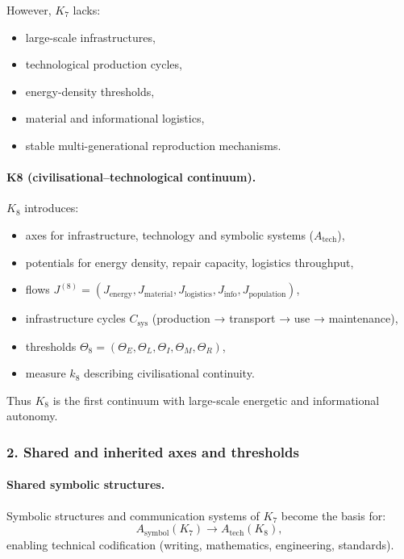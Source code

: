 However, $K_7$ lacks:
\begin{itemize}
  \item large-scale infrastructures,
  \item technological production cycles,
  \item energy-density thresholds,
  \item material and informational logistics,
  \item stable multi-generational reproduction mechanisms.
\end{itemize}

\paragraph{K8 (civilisational–technological continuum).}
$K_8$ introduces:
\begin{itemize}
  \item axes for infrastructure, technology and symbolic systems ($A_{\mathrm{tech}}$),
  \item potentials for energy density, repair capacity, logistics throughput,
  \item flows $J^{(8)} = (J_{\mathrm{energy}}, J_{\mathrm{material}},
        J_{\mathrm{logistics}}, J_{\mathrm{info}}, J_{\mathrm{population}})$,
  \item infrastructure cycles $C_{\mathrm{sys}}$ (production → transport → use → maintenance),
  \item thresholds $\Theta_8 = (\Theta_E, \Theta_L, \Theta_I, \Theta_M, \Theta_R)$,
  \item measure $k_8$ describing civilisational continuity.
\end{itemize}

Thus $K_8$ is the first continuum with large-scale energetic and informational
autonomy.

\subsubsection{2. Shared and inherited axes and thresholds}

\paragraph{Shared symbolic structures.}
Symbolic structures and communication systems of $K_7$ become the basis for:
\[
A_{\mathrm{symbol}}(K_7) \rightarrow A_{\mathrm{tech}}(K_8),
\]
enabling technical codification (writing, mathematics, engineering,
standards).

